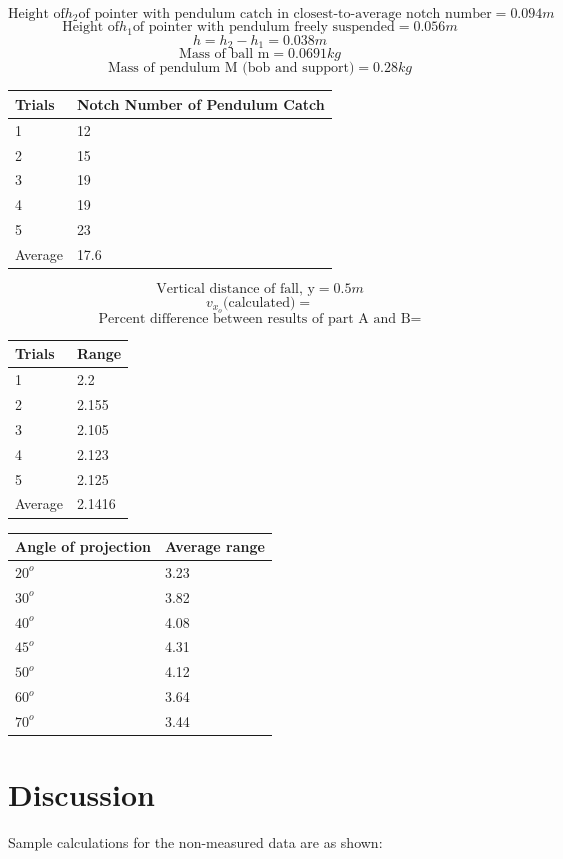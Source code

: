 \documentclass[11pt, titlepage]{article}
\begin{document}
\begin{center}
$$\text{Height of} h_2 \text{of pointer with pendulum catch in closest-to-average notch number} = 0.094 m$$
$$\text{Height of} h_1 \text{of pointer with pendulum freely suspended} = 0.056 m$$
$$h = h_2 - h_1 = 0.038 m$$
$$\text{Mass of ball m} = 0.0691 kg$$
$$\text{Mass of pendulum M (bob and support)} = 0.28 kg$$
\begin{tabular}
{|m{17em}|m{17em}|}
\hline
Trials & Notch Number of Pendulum Catch \\
\hline
1 & 12\\
\hline
2 & 15\\
\hline
3 & 19\\
\hline
4 & 19\\
\hline
5 & 23\\
\hline
Average & 17.6\\
\hline
\end{tabular}

$$\text{Vertical distance of fall, y} = 0.5 m$$
$$v_{x_o} \text{(calculated)} = $$
$$\text{Percent difference between results of part A and B} = $$
\begin{tabular}
{|m{17em}|m{17em}|}
\hline
Trials & Range\\
\hline
1 & 2.2\\
\hline
2 & 2.155\\
\hline
3 & 2.105\\
\hline
4 & 2.123\\
\hline
5 & 2.125\\
\hline
Average & 2.1416\\
\hline
\end{tabular}

\begin{tabular}
{|m{17em}|m{17em}|}
\hline
Angle of projection & Average range \\
\hline
$20^o$ & 3.23\\
\hline
$30^o$ & 3.82\\
\hline
$40^o$ & 4.08\\
\hline
$45^o$ & 4.31\\
\hline
$50^o$ & 4.12\\
\hline
$60^o$ & 3.64\\
\hline
$70^o$ & 3.44\\
\hline
\end{tabular}
\end{center}

\section*{Discussion}
Sample calculations for the non-measured data are as shown:
\end{document}
